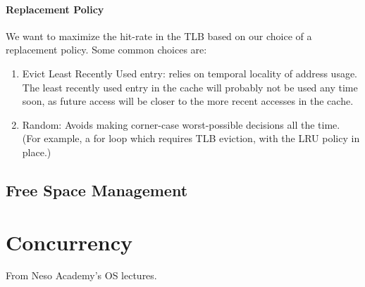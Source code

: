 \documentclass[10pt]{report}
\begin{document}
\subsubsection{Replacement Policy}
We want to maximize the hit-rate in the TLB based on our 
choice of a replacement policy. Some common choices are:
\begin{enumerate}
\item Evict Least Recently Used entry: relies on temporal locality 
of address usage. The least recently used entry in the cache will
probably not be used any time soon, as future access will be closer
to the more recent accesses in the cache.
\item Random: Avoids making corner-case worst-possible decisions all 
the time. (For example, a for loop which requires TLB eviction, with the LRU policy in place.) 
\end{enumerate}
\section{Free Space Management}
\chapter{Concurrency}
From Neso Academy's OS lectures.
\end{document}
